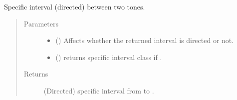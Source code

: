 \documentclass[letterpaper,10pt,english]{sphinxmanual}
\begin{document}
\begin{fulllineitems}
\begin{fulllineitems}
\begin{sphinxVerbatim}[commandchars=\\\{\}]
    
\end{sphinxVerbatim}

\begin{sphinxVerbatim}[commandchars=\\\{\}]
    
\end{sphinxVerbatim}

\end{fulllineitems}



\begin{fulllineitems}
\sphinxAtStartPar
Specific interval (directed) between two tones.
\begin{quote}\begin{description}
\item[{Parameters}] \leavevmode\begin{itemize}
\item {} 
\sphinxAtStartPar
{} () \textendash{} Affects whether the returned interval is directed or not.

\item {} 
\sphinxAtStartPar
{} () \textendash{} returns specific interval class if .

\end{itemize}

\item[{Returns}] \leavevmode
\sphinxAtStartPar
(Directed) specific interval from  to .


\end{description}
\end{quote}
\end{fulllineitems}
\end{fulllineitems}
\end{document}
